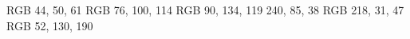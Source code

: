 \usepackage[utf8]{inputenc}
\usepackage{color}

\definecolor{black} {RGB} { 44,  50,  61}
\definecolor{gray}  {RGB} { 76, 100, 114}
\definecolor{green} {RGB} { 90, 134, 119}
\definecolor{orange}{RGB} {240,  85,  38}
\definecolor{red}   {RGB} {218,  31,  47} 
\definecolor{blue}  {RGB} { 52, 130, 190}

\usepackage{hyperref}
\hypersetup{colorlinks = true, urlcolor = blue}